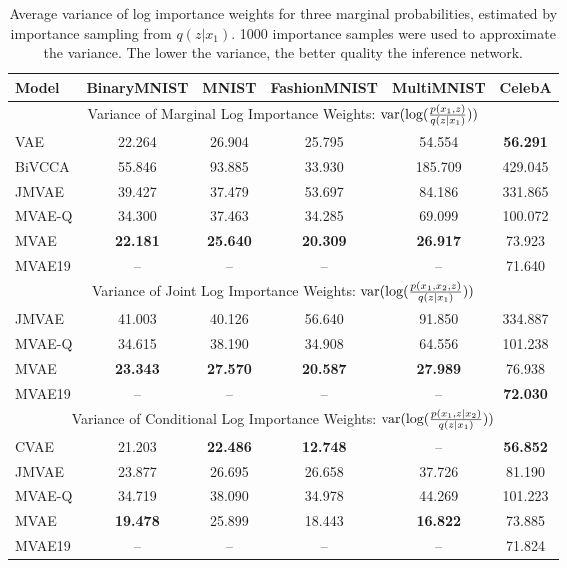 \begin{table}[h!]
\centering
\small
\begin{tabular}{ l|c|c|c|c|c }
    \toprule
    Model & BinaryMNIST & MNIST & FashionMNIST & MultiMNIST & CelebA \\
    \hline
    \multicolumn{6}{c}{Variance of Marginal Log Importance Weights: $\textup{var}(\textup{log}(\frac{p(x_1,z)}{q(z|x_1)}))$} \\
    \hline
    VAE & 22.264 & 26.904 & 25.795 & 54.554 & \textbf{56.291} \\
    BiVCCA & 55.846 & 93.885 & 33.930 & 185.709 & 429.045 \\
    JMVAE & 39.427 & 37.479 & 53.697 & 84.186 & 331.865 \\
    MVAE-Q & 34.300 & 37.463 & 34.285 & 69.099 & 100.072 \\
    MVAE & \textbf{22.181} & \textbf{25.640} & \textbf{20.309} & \textbf{26.917} & 73.923 \\
    MVAE19 & -- & -- & -- & -- & 71.640 \\
    \hline
    \multicolumn{6}{c}{Variance of Joint Log Importance Weights: $\textup{var}(\textup{log}(\frac{p(x_1,x_2,z)}{q(z|x_1)}))$} \\
    \hline
    JMVAE & 41.003 & 40.126 & 56.640 & 91.850 & 334.887 \\
    MVAE-Q & 34.615 & 38.190 & 34.908 & 64.556& 101.238\\
    MVAE & \textbf{23.343} & \textbf{27.570} & \textbf{20.587} & \textbf{27.989} & 76.938 \\
    MVAE19 & -- & -- & -- & -- & \textbf{72.030} \\
    \hline
    \multicolumn{6}{c}{Variance of Conditional Log Importance Weights: $\textup{var}(\textup{log}(\frac{p(x_1,z|x_2)}{q(z|x_1)}))$} \\
    \hline
    CVAE & 21.203 & \textbf{22.486} & \textbf{12.748} & -- & \textbf{56.852} \\
    JMVAE & 23.877 & 26.695 & 26.658 & 37.726 & 81.190 \\
    MVAE-Q & 34.719 & 38.090 & 34.978 & 44.269 & 101.223 \\
    MVAE & \textbf{19.478} & 25.899 & 18.443 & \textbf{16.822} & 73.885 \\
    MVAE19 & -- & -- & -- & -- & 71.824 \\
    \bottomrule
\end{tabular}
\caption{Average variance of log importance weights for three marginal probabilities, estimated by importance sampling from $q(z|x_1)$. 1000 importance samples were used to approximate the variance. The lower the variance, the better quality the inference network.}
\label{table:x_variances}
\end{table}
